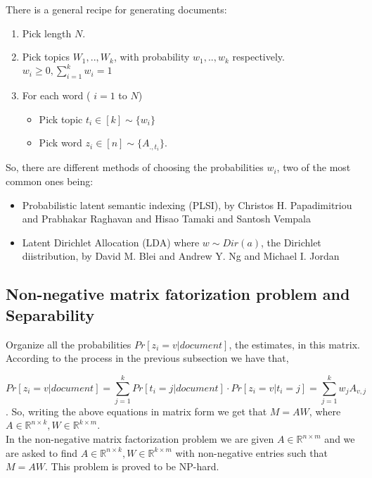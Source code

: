\documentclass[11pt]{article}
\begin{document}
There is a general recipe for generating documents:
\begin{enumerate}
\item {\em  } Pick length $N$.
\item {\em  } Pick topics $W_1,..,W_k$, with probability $w_1,..,w_k$ respectively. $w_i \geq 0, \sum_{i=1}^k w_i = 1$
\item {\em  }For each word ( $i=1$ to $N$) 
	\begin{itemize}
	\item 	Pick topic $t_i \in [k] \sim  \{ w_i \}$
	\item 	Pick word $z_i \in [n] \sim \{ A_{.,t_i}  \}$.
	\end{itemize}
\end{enumerate}




So, there are different methods of choosing the probabilities $w_i$, two of the most common ones being:

\begin{itemize}
\item Probabilistic latent semantic indexing (PLSI), by Christos H. Papadimitriou and
               Prabhakar Raghavan and
               Hisao Tamaki and
               Santosh Vempala \cite{PRTV} 
\item Latent Dirichlet Allocation (LDA) where $w \sim Dir(a)$, the Dirichlet diistribution, by David M. Blei and
               Andrew Y. Ng and
               Michael I. Jordan \cite{LDA}

\end{itemize}

\subsection{Non-negative matrix fatorization problem and Separability}

Organize all the probabilities $Pr[z_i = v| document]$, the estimates, in this matrix. According to the process in the previous subsection we have that, 

\[Pr[z_i = v| document] = \sum_{j=1}^k Pr[t_i=j|document] \cdot Pr[z_i=v|t_i=j] = \sum_{j=1}^k w_j A_{v,j}\] . So, writing the above equations in matrix form we get that $M = AW$, where $A \in \mathbb{R} ^{n\times k}, W \in \mathbb{R}^{k \times m}$.\\

In the non-negative matrix factorization problem we are given $A \in \mathbb{R}^{n\times m}$ and we are asked to find $A \in \mathbb{R} ^{n\times k}, W \in \mathbb{R}^{k \times m}$ with non-negative entries such that $M=AW$. This problem is proved to be NP-hard.\\
\end{document}
